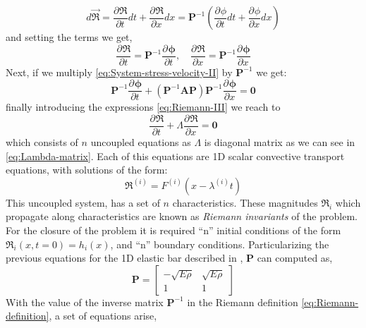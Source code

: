 \documentclass[preprint,12pt,a4paper]{elsarticle}
\newcommand{\tens}[1]{
  \ensuremath{\mathbf{{#1}}}
}
\newcommand{\Matrix}[1]{
  \ensuremath{\mathbf{{#1}}}
}
\newcommand{\Vector}[1]{
  \ensuremath{\mathbf{{#1}}}
}
\newcommand{\Deriv}[3][]{
  \ensuremath{\frac{\partial^{#1}{#2}}{ \partial {#3}^{#1} }}
}
\begin{document}
\begin{equation}
  \label{eq:Riemann-II}
  d \vec{\Vector{\Re}} = \Deriv{\Vector{\Re}}{t}dt + \Deriv{\Vector{\Re}}{x}dx =
  \tens{P}^{-1}\left(\Deriv{\phi}{t}dt + \Deriv{\phi}{x}dx \right)
\end{equation}
and setting the terms we get,
\begin{equation}
  \label{eq:Riemann-III}
  \Deriv{\Vector{\Re}}{t} = \Matrix{P}^{-1}\Deriv{\Vector{\phi}}{t},\quad 
  \Deriv{\Vector{\Re}}{x} = \Matrix{P}^{-1}\Deriv{\Vector{\phi}}{x}
\end{equation}
Next, if we multiply \eqref{eq:System-stress-velocity-II} by
$\Matrix{P}^{-1}$ we get:
\begin{equation}
  \label{eq:System-stress-velocity-III}
  \Matrix{P}^{-1}\Deriv{\Vector{\phi}}{t} + \left(\Matrix{P}^{-1}\Matrix{A}\Matrix{P}
  \right)\Matrix{P}^{-1} \Deriv{\Vector{\phi}}{x} = \Vector{0}
\end{equation}
finally introducing the expressions \eqref{eq:Riemann-III} we reach to
\begin{equation}
  \label{eq:System-stress-velocity-IV}
  \Deriv{\Vector{\Re}}{t} + \varLambda \Deriv{\Vector{\Re}}{x} = \Vector{0}  
\end{equation}
which consists of $n$ uncoupled equations as $\varLambda$ is
diagonal matrix as we can see in \eqref{eq:Lambda-matrix}. Each of
this equations are 1D scalar convective transport equations, with
solutions of the form:
\begin{equation}
  \label{eq:SystemEquations_sigma_v_VI}
  \Re^{(i)} = F^{(i)} \left(x - \lambda^{(i)} t \right)
\end{equation}
This uncoupled system, has a set of $n$ characteristics.
These magnitudes $\Re_i$ which propagate along characteristics are
known as \textit{Riemann invariants} of the problem. For the closure
of the problem it is required ``n'' initial conditions of the form
$\Re_i (x,t=0) = h_i(x)$, and ``n'' boundary
conditions. Particularizing the previous equations for the 1D elastic
bar described in \cite{Dyka1995}, $\Matrix{P}$ can computed as,
\begin{equation*}
    \Matrix{P} =  \left[
    \begin{array}{cc}
      -\sqrt{E\rho} & \sqrt{E\rho}\\
       1 & 1 
    \end{array} \right]
\end{equation*}
With the value of the inverse matrix $\Matrix{P}^{-1}$ in the Riemann
definition \eqref{eq:Riemann-definition}, a set of equations arise,
\end{document}
